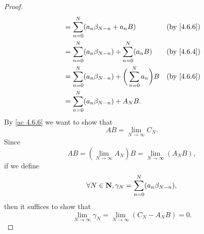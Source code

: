 \begin{proof}
\begin{align*}
                          & = \sum_{n = 0}^N (a_n \beta_{N - n} + a_n B)                            & \text{(by \cref{4.6.6})} \\
                          & = \sum_{n = 0}^N (a_n \beta_{N - n}) + \sum_{n = 0}^N (a_n B)           & \text{(by \cref{4.6.4})} \\
                          & = \sum_{n = 0}^N (a_n \beta_{N - n}) + \bigg(\sum_{n = 0}^N a_n\bigg) B & \text{(by \cref{4.6.6})} \\
                          & = \sum_{n = 0}^N (a_n \beta_{N - n}) + A_N B.
  \end{align*}
  By \cref{ac 4.6.6} we want to show that
  \[
    AB = \lim_{N \to \infty} C_N.
  \]
  Since
  \[
    AB = (\lim_{N \to \infty} A_N) B = \lim_{N \to \infty} (A_N B),
  \]
  if we define
  \[
    \forall N \in \mathbf{N}, \gamma_N = \sum_{n = 0}^N (a_n \beta_{N - n}),
  \]
  then it suffices to show that
  \[
    \lim_{N \to \infty} \gamma_N = \lim_{N \to \infty} (C_N - A_N B) = 0.
  \]


\end{proof}
